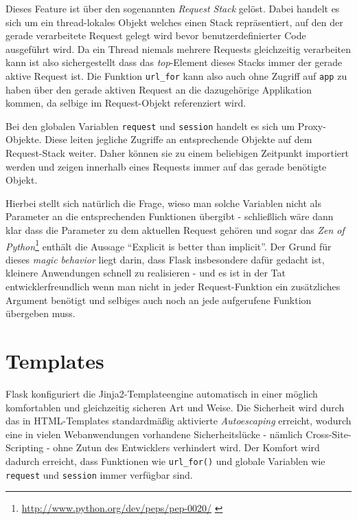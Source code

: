 Dieses Feature ist über den sogenannten \emph{Request Stack} gelöst. Dabei handelt es sich um ein
thread-lokales Objekt welches einen Stack repräsentiert, auf den der gerade verarbeitete Request
gelegt wird bevor benutzerdefinierter Code ausgeführt wird. Da ein Thread niemals mehrere Requests
gleichzeitig verarbeiten kann ist also sichergestellt dass das \emph{top}-Element dieses Stacks
immer der gerade aktive Request ist. Die Funktion \lstinline{url_for} kann also auch ohne Zugriff
auf \lstinline{app} zu haben über den gerade aktiven Request an die dazugehörige Applikation kommen,
da selbige im Request-Objekt referenziert wird.

Bei den globalen Variablen \lstinline{request} und \lstinline{session} handelt es sich um
Proxy-Objekte. Diese leiten jegliche Zugriffe an entsprechende Objekte auf dem Request-Stack weiter.
Daher können sie zu einem beliebigen Zeitpunkt importiert werden und zeigen innerhalb eines Requests
immer auf das gerade benötigte Objekt.

Hierbei stellt sich natürlich die Frage, wieso man solche Variablen nicht als Parameter an die
entsprechenden Funktionen übergibt - schließlich wäre dann klar dass die Parameter zu dem aktuellen
Request gehören und sogar das \emph{Zen of
Python}\footnote{\href{http://www.python.org/dev/peps/pep-0020/}{http://www.python.org/dev/peps/pep-0020/}
\citep{zenofpython}}
enthält die Aussage \enquote{Explicit is better than implicit}. Der Grund für dieses \emph{magic
behavior} liegt darin, dass Flask insbesondere dafür gedacht ist, kleinere Anwendungen schnell zu
realisieren - und es ist in der Tat entwicklerfreundlich wenn man nicht in jeder Request-Funktion
ein zusätzliches Argument benötigt und selbiges auch noch an jede aufgerufene Funktion übergeben
muss.

\section{Templates}

Flask konfiguriert die Jinja2-Templateengine automatisch in einer möglich komfortablen und
gleichzeitig sicheren Art und Weise. Die Sicherheit wird durch das in HTML-Templates standardmäßig
aktivierte \emph{Autoescaping} erreicht, wodurch eine in vielen Webanwendungen vorhandene
Sicherheitslücke - nämlich Cross-Site-Scripting - ohne Zutun des Entwicklers verhindert wird. Der
Komfort wird dadurch erreicht, dass Funktionen wie \lstinline{url_for()} und globale Variablen wie
\lstinline{request} und \lstinline{session} immer verfügbar sind.

